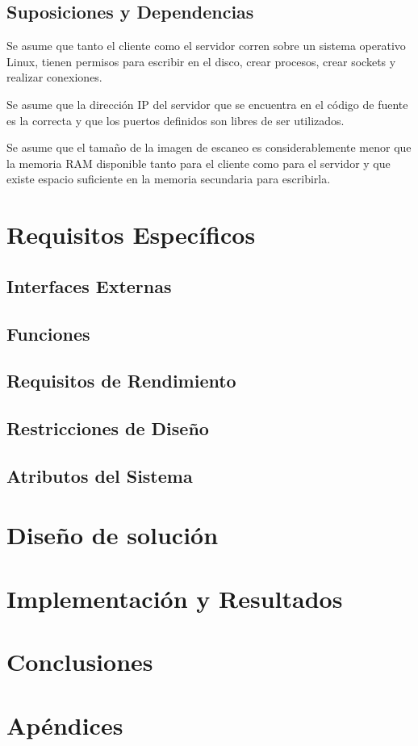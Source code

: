 \documentclass[11pt]{unc_so2}
\begin{document}
\subsection{Suposiciones y Dependencias}
Se asume que tanto el cliente como el servidor corren sobre un sistema operativo
Linux, tienen permisos para escribir en el disco, crear procesos, crear sockets
y realizar conexiones.

Se asume que la dirección IP del servidor que se encuentra en el código de
fuente es la correcta y que los puertos definidos son libres de ser utilizados.

Se asume que el tamaño de la imagen de escaneo es considerablemente menor que la
memoria RAM disponible tanto para el cliente como para el servidor y que existe
espacio suficiente en la memoria secundaria para escribirla.

\section{Requisitos Específicos}\label{sec:espec}
\subsection{Interfaces Externas}
\subsection{Funciones}
\subsection{Requisitos de Rendimiento}
\subsection{Restricciones de Diseño}
\subsection{Atributos del Sistema}
\section{Diseño de solución}\label{sec:design}
\section{Implementación y Resultados}\label{sec:impl}
\section{Conclusiones}\label{sec:concl}
\section{Apéndices}\label{sec:apnd}

\printbibliography[heading=subbibintoc]
\end{document}
